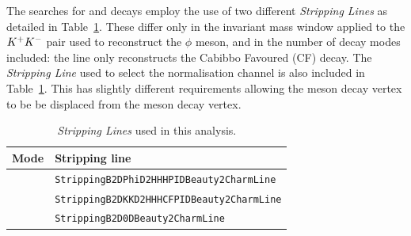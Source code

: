 The searches for \decay{\Bp}{\Dsp\phiz} and \decay{\Bp}{\Dsp\Kp\Km} decays employ the use of two different \emph{Stripping Lines} as detailed in Table~\ref{tab:strippinglines}. These differ only in the invariant mass window applied to the ${{K}^+}{{K}^-}$ pair used to reconstruct the $\phi$ meson, and in the number of \Dsp decay modes included: the \decay{\Bp}{\Dsp\Kp\Km} line only reconstructs the Cabibbo Favoured (CF) \decay{\Dsp}{\Kp\Km\pip} decay. The \emph{Stripping Line} used to select the normalisation channel \decay{\Bp}{\Dsp\Dzb} is also included in Table~\ref{tab:strippinglines}. This has slightly different requirements allowing the \Dzb meson decay vertex to be be displaced from the \Bp meson decay vertex.


\begin{table}[t]
\begin{center}
\begin{tabular}{l l}

\hline
Mode & Stripping line \\ 
\hline
\decay{\Bp}{\Dsp\phiz}        & \texttt{StrippingB2DPhiD2HHHPIDBeauty2CharmLine}    \\
\decay{\Bp}{\Dsp\Kp\Km}       & \texttt{StrippingB2DKKD2HHHCFPIDBeauty2CharmLine}   \\
\decay{\Bp}{\Dsp\Dzb}         & \texttt{StrippingB2D0DBeauty2CharmLine}             \\
\hline
\end{tabular}
\end{center}
\caption{\emph{Stripping Lines} used in this analysis.}
\label{tab:strippinglines}
\end{table}


